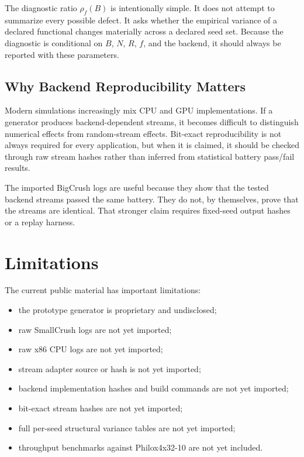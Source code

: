 \documentclass[11pt,a4paper]{article}
\begin{document}
The diagnostic ratio $\rho_f(B)$ is intentionally simple. It does not attempt to summarize every possible defect. It asks whether the empirical variance of a declared functional changes materially across a declared seed set. Because the diagnostic is conditional on $B$, $N$, $R$, $f$, and the backend, it should always be reported with these parameters.

\subsection{Why Backend Reproducibility Matters}

Modern simulations increasingly mix CPU and GPU implementations. If a generator produces backend-dependent streams, it becomes difficult to distinguish numerical effects from random-stream effects. Bit-exact reproducibility is not always required for every application, but when it is claimed, it should be checked through raw stream hashes rather than inferred from statistical battery pass/fail results.

The imported BigCrush logs are useful because they show that the tested backend streams passed the same battery. They do not, by themselves, prove that the streams are identical. That stronger claim requires fixed-seed output hashes or a replay harness.

\section{Limitations}

The current public material has important limitations:

\begin{itemize}[nosep]
  \item the prototype generator is proprietary and undisclosed;
  \item raw SmallCrush logs are not yet imported;
  \item raw x86 CPU logs are not yet imported;
  \item stream adapter source or hash is not yet imported;
  \item backend implementation hashes and build commands are not yet imported;
  \item bit-exact stream hashes are not yet imported;
  \item full per-seed structural variance tables are not yet imported;
  \item throughput benchmarks against Philox4x32-10 are not yet included.
\end{itemize}
\end{document}
